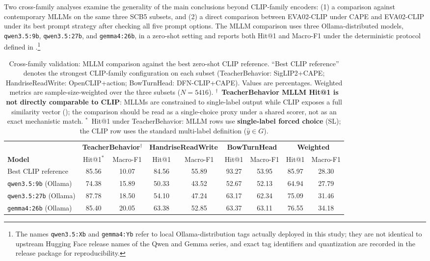 \documentclass[symmetry,article,submit,pdftex,moreauthors]{Definitions/mdpi}
\begin{document}
Two cross-family analyses examine the generality of the main conclusions beyond CLIP-family encoders: (1) a comparison against contemporary MLLMs on the same three SCB5 subsets, and (2) a direct comparison between EVA02-CLIP under CAPE and EVA02-CLIP under its best prompt strategy after checking all five prompt options. The MLLM comparison uses three Ollama-distributed models, \texttt{qwen3.5:9b}, \texttt{qwen3.5:27b}, and \texttt{gemma4:26b}, in a zero-shot setting and reports both Hit@1 and Macro-F1 under the deterministic protocol defined in .\footnote{The names \texttt{qwen3.5:Xb} and \texttt{gemma4:Yb} refer to local Ollama-distribution tags actually deployed in this study; they are not identical to upstream Hugging Face release names of the Qwen and Gemma series, and exact tag identifiers and quantization are recorded in the release package for reproducibility.}

\begin{table}[H]
\caption{Cross-family validation: MLLM comparison against the best zero-shot CLIP reference. ``Best CLIP reference'' denotes the strongest CLIP-family configuration on each subset (TeacherBehavior: SigLIP2+CAPE; HandriseReadWrite: OpenCLIP+action; BowTurnHead: DFN-CLIP+CAPE). Values are percentages. Weighted metrics are sample-size-weighted over the three subsets ($N=5416$). $^{\dagger}$~\textbf{TeacherBehavior MLLM Hit@1 is not directly comparable to CLIP}: MLLMs are constrained to single-label output while CLIP exposes a full similarity vector (); the comparison should be read as a single-choice proxy under a shared scorer, not as an exact mechanistic match. $^{*}$~Hit@1 under TeacherBehavior: MLLM rows use \textbf{single-label forced choice} (SL); the CLIP row uses the standard multi-label definition ($\hat{y}\in G$).}
\label{tab:mllm_validation}
\centering
\small
\setlength{\tabcolsep}{3pt}
\begin{tabular}{l cc cc cc cc}
\toprule
 & \multicolumn{2}{c}{\textbf{TeacherBehavior}$^{\dagger}$} & \multicolumn{2}{c}{\textbf{HandriseReadWrite}} & \multicolumn{2}{c}{\textbf{BowTurnHead}} & \multicolumn{2}{c}{\textbf{Weighted}} \\
\cmidrule(lr){2-3}\cmidrule(lr){4-5}\cmidrule(lr){6-7}\cmidrule(lr){8-9}
\textbf{Model} & Hit@1$^{*}$ & Macro-F1 & Hit@1 & Macro-F1 & Hit@1 & Macro-F1 & Hit@1 & Macro-F1 \\
\midrule
Best CLIP reference & 85.56 & 10.07 & 84.56 & 55.89 & 93.27 & 53.95 & 85.97 & 28.30 \\
\texttt{qwen3.5:9b} (Ollama) & 74.38 & 15.89 & 50.33 & 43.52 & 52.67 & 52.13 & 64.94 & 27.79 \\
\texttt{qwen3.5:27b} (Ollama) & 87.78 & 18.50 & 54.10 & 47.24 & 63.17 & 62.34 & 75.09 & 31.46 \\
\texttt{gemma4:26b} (Ollama) & 85.40 & 20.05 & 63.38 & 52.85 & 63.37 & 63.11 & 76.55 & 34.18 \\
\bottomrule
\end{tabular}
\end{table}
\end{document}

